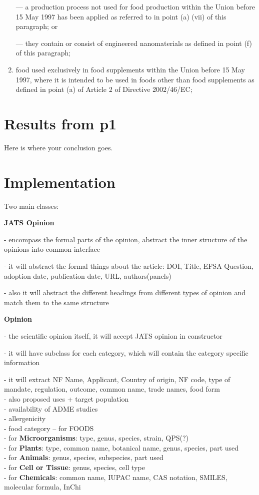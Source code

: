 \documentclass[12pt]{article}
\begin{document}
\begin{enumerate}[label=(\roman*)]
    — a production process not used for food production within the Union before 15 May 1997 has been applied
    as referred to in point (a) (vii) of this paragraph; or
    
    — they contain or consist of engineered nanomaterials as defined in point (f) of this paragraph;
    \item food used exclusively in food supplements within the Union before 15 May 1997, where it is intended to be
    used in foods other than food supplements as defined in point (a) of Article 2 of Directive 2002/46/EC;
\end{enumerate}

\section{Results from p1}
Here is where your conclusion goes.

\section{Implementation}

Two main classes:

\textbf{JATS Opinion}
 
- encompass the formal parts of the opinion, abstract the inner structure of the opinions into common interface

- it will abstract the formal things about the article: DOI, Title, EFSA Question, adoption date, publication date,
URL, authors(panels)

- also it will abstract the different headings from different types of opinion and match them to the same structure

\textbf{Opinion} 

- the scientific opinion itself, it will accept JATS opinion in constructor

- it will have subclass for each category, which will contain the category specific information

- it will extract NF Name, Applicant, Country of origin, NF code, type of mandate, regulation, outcome,
common name, trade names, food form\\
- also proposed uses + target population\\
- availability of ADME studies\\
- allergenicity\\
- food category -- for FOODS\\
- for \textbf{Microorganisms}: type, genus, species, strain, QPS(?)\\
- for \textbf{Plants}: type, common name, botanical name, genus, species, part used\\
- for \textbf{Animals}: genus, species, subspecies, part used\\
- for \textbf{Cell or Tissue}: genus, species, cell type\\
- for \textbf{Chemicals}: common name, IUPAC name, CAS notation, SMILES, molecular formula, InChi
\end{document}
